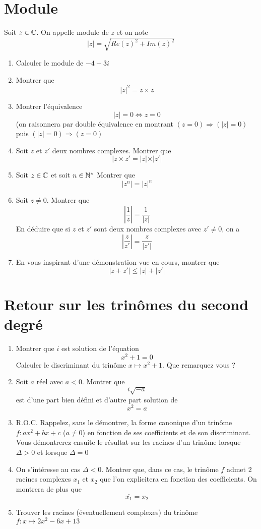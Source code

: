 \section{Module}
Soit $z\in\mathbb{C}$. On appelle module de $z$ et on note $$|z| = \sqrt{Re(z)^2 + Im(z)^2}$$
\begin{enumerate}
\item Calculer le module de $-4+3i$
\item Montrer que 
$$|z|^2 = z\times \overline{z}$$
\item Montrer l'équivalence 
$$|z| = 0 \Leftrightarrow z = 0$$
(on raisonnera par double équivalence en montrant $(z = 0) \Rightarrow (|z| = 0)$ puis $(|z| = 0) \Rightarrow (z = 0)$
\item Soit $z$ et $z'$ deux nombres complexes. Montrer que $$|z\times z' = |z|\times |z'|$$
\item Soit $z\in\mathbb{C}$ et soit $n\in \mathbb{N}^*$ Montrer que 
$$|z^n| = |z|^n$$
\item Soit $z \neq 0$. Montrer que 
$$\left|\frac{1}{z}\right| = \frac{1}{|z|}$$
En déduire que si $z$ et $z'$ sont deux nombres complexes avec $z'\neq 0$, on a 
$$\left|\frac{z}{z'}\right| = \frac{z}{|z'|}$$
\item En vous inspirant d'une démonstration vue en cours, montrer que 
$$|z+z'| \leq |z| + |z'|$$
\end{enumerate}
\section{Retour sur les trinômes du second degré}
\begin{enumerate}
\item Montrer que $i$ est solution de l'équation 
$$x^2+1 = 0$$
Calculer le discriminant du trinôme $x\mapsto x^2 +1$. Que remarquez vous ?
\item Soit $a$ réel avec $a<0$. Montrer que 
$$i\sqrt{-a}$$
est d'une part bien défini et d'autre part solution de 
$$x^2 = a$$
\item R.O.C. Rappelez, sans le démontrer, la forme canonique d'un trinôme $f:ax^2+bx+c$ ($a\neq0$) en fonction de ses coefficients et de son discriminant. Vous démontrerez ensuite le résultat sur les racines d'un trinôme lorsque $\Delta > 0$ et lorsque $\Delta = 0$
\item On s'intéresse au cas $\Delta < 0$. Montrer que, dans ce cas, le trinôme $f$ admet 2 racines complexes $x_1$ et $x_2$ que l'on explicitera en fonction des coefficients. On montrera de plus que $$\overline{x_1} = x_2$$
\item Trouver les racines (éventuellement complexes) du trinôme $f:x\mapsto 2x^2 -6x +13$
\end{enumerate}
